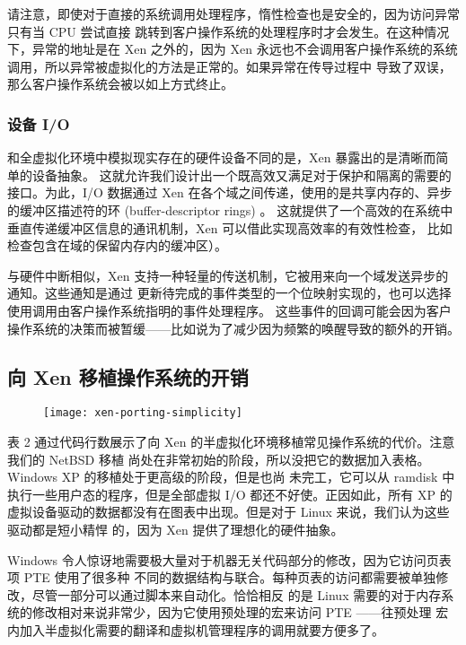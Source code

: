 请注意，即使对于直接的系统调用处理程序，惰性检查也是安全的，因为访问异常只有当 CPU 尝试直接
跳转到客户操作系统的处理程序时才会发生。在这种情况下，异常的地址是在 Xen 之外的，因为 Xen
永远也不会调用客户操作系统的系统调用，所以异常被虚拟化的方法是正常的。如果异常在传导过程中
导致了双误，那么客户操作系统会被以如上方式终止。

\subsubsection{设备 I/O}

和全虚拟化环境中模拟现实存在的硬件设备不同的是，Xen 暴露出的是清晰而简单的设备抽象。
这就允许我们设计出一个既高效又满足对于保护和隔离的需要的接口。为此，I/O 数据通过 Xen
在各个域之间传递，使用的是共享内存的、异步的缓冲区描述符的环 (buffer-descriptor rings) 。
这就提供了一个高效的在系统中垂直传递缓冲区信息的通讯机制，Xen 可以借此实现高效率的有效性检查，
比如检查包含在域的保留内存内的缓冲区）。

与硬件中断相似，Xen 支持一种轻量的传送机制，它被用来向一个域发送异步的通知。这些通知是通过
更新待完成的事件类型的一个位映射实现的，也可以选择使用调用由客户操作系统指明的事件处理程序。
这些事件的回调可能会因为客户操作系统的决策而被暂缓——比如说为了减少因为频繁的唤醒导致的额外的开销。

\subsection{向 Xen 移植操作系统的开销}

\begin{figure}[h]
    \centering
    \texttt{[image: xen-porting-simplicity]}
\end{figure}

表 2 通过代码行数展示了向 Xen 的半虚拟化环境移植常见操作系统的代价。注意我们的 NetBSD 移植
尚处在非常初始的阶段，所以没把它的数据加入表格。Windows XP 的移植处于更高级的阶段，但是也尚
未完工，它可以从 ramdisk 中执行一些用户态的程序，但是全部虚拟 I/O 都还不好使。正因如此，所有
XP 的虚拟设备驱动的数据都没有在图表中出现。但是对于 Linux 来说，我们认为这些驱动都是短小精悍
的，因为 Xen 提供了理想化的硬件抽象。

Windows 令人惊讶地需要极大量对于机器无关代码部分的修改，因为它访问页表项 PTE 使用了很多种
不同的数据结构与联合。每种页表的访问都需要被单独修改，尽管一部分可以通过脚本来自动化。恰恰相反
的是 Linux 需要的对于内存系统的修改相对来说非常少，因为它使用预处理的宏来访问 PTE ——往预处理
宏内加入半虚拟化需要的翻译和虚拟机管理程序的调用就要方便多了。

